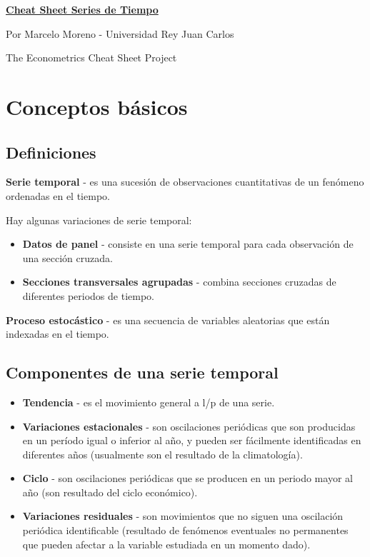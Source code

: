 \documentclass[10pt, a4paper, landscape]{article}
\begin{document}
	\begin{multicols}{3}
		\begin{center}
			\textbf{\LARGE \href{https://github.com/marcelomijas/econometrics-cheatsheet}{Cheat Sheet Series de Tiempo}}
			
			{\footnotesize Por Marcelo Moreno - Universidad Rey Juan Carlos}
			
			{\footnotesize The Econometrics Cheat Sheet Project}
		\end{center}
		
		\section*{Conceptos básicos}
		
		\subsection*{Definiciones}
		
		\textbf{Serie temporal} - es una sucesión de observaciones cuantitativas de un fenómeno ordenadas en el tiempo.
		
		Hay algunas variaciones de serie temporal:
		
		\begin{itemize}[leftmargin=*]
			\item \textbf{Datos de panel} - consiste en una serie temporal para cada observación de una sección cruzada.
			\item \textbf{Secciones transversales agrupadas} - combina secciones cruzadas de diferentes periodos de tiempo.
		\end{itemize}
		
		\textbf{Proceso estocástico} - es una secuencia de variables aleatorias que están indexadas en el tiempo.
		
		\subsection*{Componentes de una serie temporal}
		
		\begin{itemize}[leftmargin=*]
			\item \textbf{Tendencia} - es el movimiento general a l/p de una serie.
			\item \textbf{Variaciones estacionales} - son oscilaciones periódicas que son producidas en un período igual o inferior al año, y pueden ser fácilmente identificadas en diferentes años (usualmente son el resultado de la climatología).
			\item \textbf{Ciclo} - son oscilaciones periódicas que se producen en un periodo mayor al año (son resultado del ciclo económico).
			\item \textbf{Variaciones residuales} - son movimientos que no siguen una oscilación periódica identificable (resultado de fenómenos eventuales no permanentes que pueden afectar a la variable estudiada en un momento dado).
		\end{itemize}
		

\end{multicols}
\end{document}
